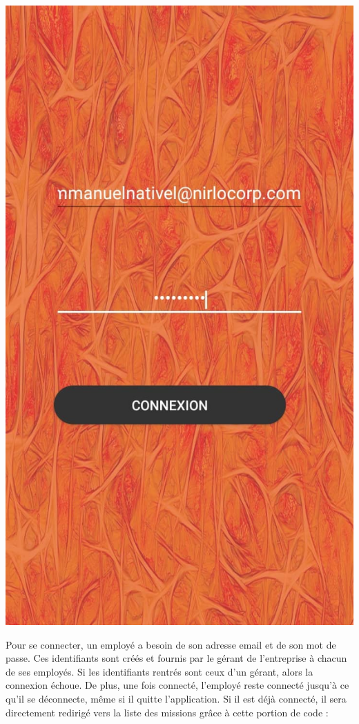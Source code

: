 \documentclass{article}
\begin{document}
\begin{center}
  \includegraphics[scale=0.15]{loginAnd.jpg}
\end{center}


Pour se connecter, un employé a besoin de son adresse email et de son mot de passe. Ces identifiants sont créés et fournis par le gérant de l'entreprise à chacun de ses employés. Si les identifiants rentrés sont ceux d'un gérant, alors la connexion échoue. De plus, une fois connecté, l'employé reste connecté jusqu'à ce qu'il se déconnecte, même si il quitte l'application. Si il est déjà connecté, il sera directement redirigé vers la liste des missions grâce à cette portion de code :
\end{document}
